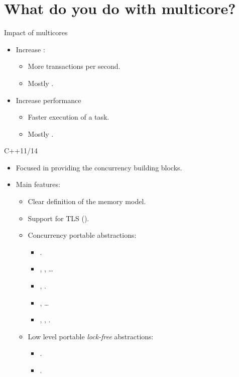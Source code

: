 \section{What do you do with multicore?}

\begin{frame}[t]{Impact of multicores}
\begin{itemize}
\item Increase :
  \begin{itemize}
    \item More transactions per second.
    \item Mostly .
  \end{itemize}

\item Increase performance
  \begin{itemize}
    \item Faster execution of a task.
    \item Mostly .
  \end{itemize}
\end{itemize}
\end{frame}

\begin{frame}[t]{C++11/14}
\begin{itemize}
  \item Focused in providing the concurrency building blocks.
  \item Main features:
    \begin{itemize}
      \item Clear definition of the memory model.
      \item Support for TLS ().
      \item Concurrency portable abstractions:
        \begin{itemize}
          \item {}.
          \item {}, , \ldots
          \item {}, .
          \item {}, \ldots
          \item {}, , .
        \end{itemize}
      \item Low level portable \emph{lock-free} abstractions:
        \begin{itemize}
          \item {}.
          \item {}.
        \end{itemize}
    \end{itemize}
\end{itemize}
\end{frame}

